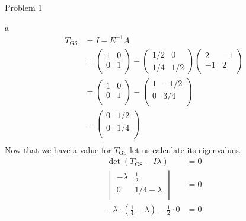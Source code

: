 \begin{section}{Problem 1}
\begin{solution}{a}
        \begin{align*}
            T_\text{GS} &= I - E^{-1} A \\
            &= \begin{pmatrix}
                1 & 0 \\
                0 & 1 \\
            \end{pmatrix}
            - \begin{pmatrix}
                1/2 & 0 \\
                1/4 & 1/2
            \end{pmatrix}
            \begin{pmatrix}
                2 & -1 \\
                -1 & 2 \\        
            \end{pmatrix} \\
            &= \begin{pmatrix}
                1 & 0 \\
                0 & 1 \\
            \end{pmatrix}
            - \begin{pmatrix}
                1 & -1/2 \\
                0 & 3/4 \\
            \end{pmatrix} \\
            &= \begin{pmatrix}
                0 & 1/2 \\
                0 & 1/4 \\
            \end{pmatrix} \\
        \end{align*}
        \continued
        Now that we have a value for $T_\text{GS}$ let us calculate its eigenvalues.
        \begin{align*}
            \det \left( T_\text{GS} - I \lambda \right) &= 0 \\
            \begin{vmatrix}
                -\lambda & \frac{1}{2} \\
                0 & 1/4 -\lambda \\
            \end{vmatrix} &= 0 \\
            -\lambda \cdot \left( \frac{1}{4} - \lambda \right) - \frac{1}{2} \cdot 0 &= 0 \\

\end{align*}
\end{solution}
\end{section}
